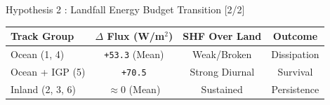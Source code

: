 \documentclass[8pt, aspectratio=169]{beamer}
\begin{document}
\begin{frame}{Hypothesis 2 : Landfall Energy Budget Transition [2/2]}
    \vspace{0.1cm}
    \begin{center}
    \begin{tabular}{lccc}
        \toprule
        \textbf{Track Group} & \textbf{$\Delta$ Flux (W/m$^2$)} & \textbf{SHF Over Land} & \textbf{Outcome} \\
        \midrule
        Ocean (1, 4) & \texttt{+53.3} (Mean) & Weak/Broken & Dissipation \\
        Ocean + IGP (5)  & \texttt{+70.5} & Strong Diurnal & Survival \\
        Inland (2, 3, 6)& $\approx 0$ (Mean) & Sustained & Persistence \\
        \bottomrule
    \end{tabular}
    \end{center}
\end{frame}
\end{document}
